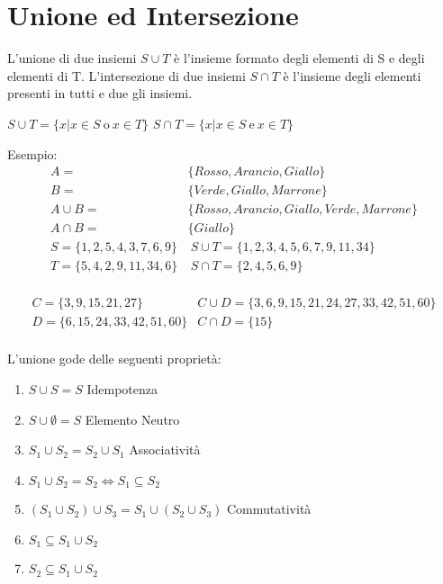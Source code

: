 \section{Unione ed Intersezione}
L'unione di due insiemi $S \cup T$ è l'insieme formato degli elementi di S e degli
elementi di T.\newline
L'intersezione di due insiemi $S \cap T$ è l'insieme degli elementi presenti in
tutti e due gli insiemi.

$S \cup T = \{x | x \in S \ \text{o} \ x \in T \} $ \newline
$S \cap T = \{x | x \in S \ \text{e} \ x \in T \} $

Esempio:
\begin{align*}
A = & \{Rosso,Arancio,Giallo \} \\
B = & \{Verde,Giallo,Marrone \} \\
A \cup B = & \{Rosso,Arancio,Giallo,Verde,Marrone \} \\
A \cap B = & \{Giallo \} \\
S = \{1,2,5,4,3,7,6,9\}  & \ S \cup T = \{1,2,3,4,5,6,7,9,11,34\} \\
T = \{5,4,2,9,11,34,6\}  & \ S \cap T = \{2,4,5,6,9\} \\
\end{align*}

\begin{equation*}
\begin{split}
C = \{3,9,15,21,27\}  & C \cup D = \{3,6,9,15,21,24,27,33,42,51,60\} \\
D = \{6,15,24,33,42,51,60\} & C \cap D = \{15\}\\
\end{split}
\end{equation*}

\begin{prop}
    L'unione gode delle seguenti proprietà:
\end{prop}
\begin{enumerate}
\item $S \cup S = S$ \quad Idempotenza
\item $S \cup \emptyset = S$ \quad Elemento Neutro
\item $S_1 \cup S_2 = S_2 \cup S_1$ \quad Associatività
\item $S_1 \cup S_2 = S_2 \iff S_1 \subseteq S_2$
\item $(S_1 \cup S_2) \cup S_3 = S_1 \cup (S_2 \cup S_3)$ \quad Commutatività
\item $S_1 \subseteq S_1 \cup S_2$
\item $S_2 \subseteq S_1 \cup S_2$
\end{enumerate}

